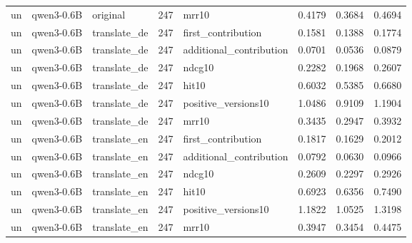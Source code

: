 \begin{tabular}{lllrlrrr}
un & qwen3-0.6B & original & 247 & mrr10 & 0.4179 & 0.3684 & 0.4694 \\
un & qwen3-0.6B & translate\_de & 247 & first\_contribution & 0.1581 & 0.1388 & 0.1774 \\
un & qwen3-0.6B & translate\_de & 247 & additional\_contribution & 0.0701 & 0.0536 & 0.0879 \\
un & qwen3-0.6B & translate\_de & 247 & ndcg10 & 0.2282 & 0.1968 & 0.2607 \\
un & qwen3-0.6B & translate\_de & 247 & hit10 & 0.6032 & 0.5385 & 0.6680 \\
un & qwen3-0.6B & translate\_de & 247 & positive\_versions10 & 1.0486 & 0.9109 & 1.1904 \\
un & qwen3-0.6B & translate\_de & 247 & mrr10 & 0.3435 & 0.2947 & 0.3932 \\
un & qwen3-0.6B & translate\_en & 247 & first\_contribution & 0.1817 & 0.1629 & 0.2012 \\
un & qwen3-0.6B & translate\_en & 247 & additional\_contribution & 0.0792 & 0.0630 & 0.0966 \\
un & qwen3-0.6B & translate\_en & 247 & ndcg10 & 0.2609 & 0.2297 & 0.2926 \\
un & qwen3-0.6B & translate\_en & 247 & hit10 & 0.6923 & 0.6356 & 0.7490 \\
un & qwen3-0.6B & translate\_en & 247 & positive\_versions10 & 1.1822 & 1.0525 & 1.3198 \\
un & qwen3-0.6B & translate\_en & 247 & mrr10 & 0.3947 & 0.3454 & 0.4475 \\
\bottomrule
\end{tabular}
